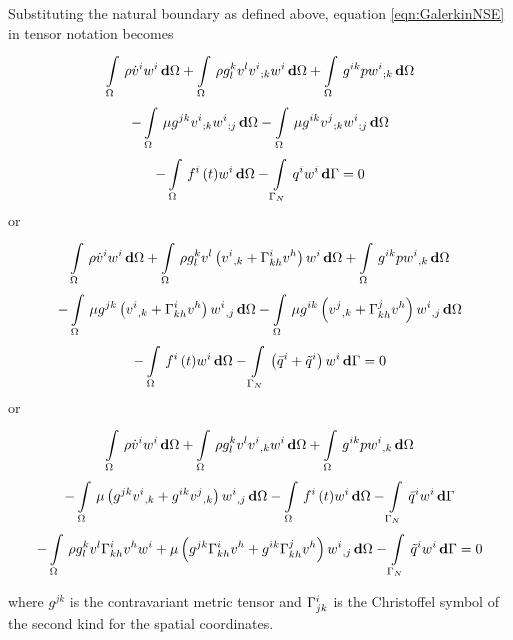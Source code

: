 Substituting the natural boundary as defined above, equation
\ref{eqn:GalerkinNSE} in tensor notation becomes
\begin{multline}
  \gint{\Omega}{}{\rho\dot{v}^{i}w^{i}}{\Omega}
 +\gint{\Omega}{}{{\rho}g^{k}_{l}v^{l}\covarderiv{v^{i}}{k}w^{i}}{\Omega}
 +\gint{\Omega}{}{g^{ik}{p}\covarderiv{w^{i}}{k}}{\Omega}\\
 -\gint{\Omega}{}{{\mu}g^{jk}\covarderiv{v^{i}}{k}\covarderiv{w^{i}}{j}}{\Omega}
 -\gint{\Omega}{}{{\mu}g^{ik}\covarderiv{v^{j}}{k}\covarderiv{w^{i}}{j}}{\Omega}\\
 -\gint{\Omega}{}{{\fnof{f^{i}}{t}}{w^{i}}}{\Omega}
 -\gint{\Gamma_N}{}{{q^{i}}{w^{i}}}{\Gamma}=0
 \label{eqn:TensorNSE}
\end{multline}
or
\begin{multline}
  \gint{\Omega}{}{\rho\dot{v}^{i}w^{i}}{\Omega}
 +\gint{\Omega}{}{{\rho}g^{k}_{l}{v^{l}}\pbrac{\partialderiv{v^{i}}{k}+\christoffel{i}{k}{h}v^{h}}{w^{i}}}{\Omega}
 +\gint{\Omega}{}{g^{ik}{p}\partialderiv{w^{i}}{k}}{\Omega}\\
 -\gint{\Omega}{}{{\mu}g^{jk}\pbrac{\partialderiv{v^{i}}{k}+\christoffel{i}{k}{h}v^{h}}\partialderiv{w^{i}}{j}}{\Omega}
 -\gint{\Omega}{}{{\mu}g^{ik}\pbrac{\partialderiv{v^{j}}{k}+\christoffel{j}{k}{h}v^{h}}\partialderiv{w^{i}}{j}}{\Omega}\\
 -\gint{\Omega}{}{{\fnof{f^{i}}{t}}{w^{i}}}{\Omega}
 -\gint{\Gamma_N}{}{\pbrac{\bar{q}^{i}+\tilde{q}^{i}}w^{i}}{\Gamma}=0
 \label{eqn:Tensor2NSE}
\end{multline}
or
\begin{multline}
  \gint{\Omega}{}{\rho\dot{v}^{i}w^{i}}{\Omega}
 +\gint{\Omega}{}{{\rho}g^{k}_{l}{v^{l}}\partialderiv{v^{i}}{k}{w^{i}}}{\Omega}
 +\gint{\Omega}{}{g^{ik}{p}\partialderiv{w^{i}}{k}}{\Omega}\\
 -\gint{\Omega}{}{\mu\pbrac{g^{jk}\partialderiv{v^{i}}{k}+g^{ik}\partialderiv{v^{j}}{k}}\partialderiv{w^{i}}{j}}{\Omega}
 -\gint{\Omega}{}{{\fnof{f^{i}}{t}}{w^{i}}}{\Omega}
 -\gint{\Gamma_N}{}{\bar{q}^{i}w^{i}}{\Gamma}\\
 -\gint{\Omega}{}{\rho
   g^{k}_{l}v^{l}\christoffel{i}{k}{h}v^{h}w^{i}+\mu\pbrac{g^{jk}\christoffel{i}{k}{h}v^{h}+
     g^{ik}\christoffel{j}{k}{h}v^{h}}\partialderiv{w^{i}}{j}}{\Omega}
 -\gint{\Gamma_N}{}{\tilde{q}^{i}w^{i}}{\Gamma}=0
 \label{eqn:Tensor3NSE}
\end{multline}

where $g^{jk}$ is the contravariant metric tensor and $ \Gamma^{i}_{jk} $
is the Christoffel symbol of the second kind for the spatial coordinates.

